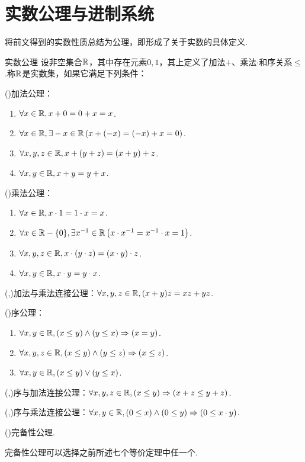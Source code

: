 \section{实数公理与进制系统}

将前文得到的实数性质总结为公理，即形成了关于实数的具体定义.

\begin{axiom}{实数公理}
	设非空集合$\mathbb{R}$，其中存在元素$0,1$，其上定义了加法$+$、乘法$\cdot$和序关系$\leq$.称$\mathbb{R}$是实数集，如果它满足下列条件：
	
	(\uppercase\expandafter{})加法公理：
	\begin{enumerate}
		\item $\forall x \in \mathbb{R} ,x+0=0+x=x$.
		\item $\forall x \in \mathbb{R} ,\exists -x \in \mathbb{R} \left( x+(-x)=(-x)+x=0 \right)$.
		\item $\forall x,y,z \in \mathbb{R} ,x+(y+z)=(x+y)+z$.
		\item $\forall x,y \in \mathbb{R} ,x+y=y+x$.
	\end{enumerate}
	
	(\uppercase\expandafter{})乘法公理：
	\begin{enumerate}
		\item $\forall x \in \mathbb{R} ,x \cdot 1=1 \cdot x=x$.
		\item $\forall x \in \mathbb{R} -\{ 0 \} ,\exists x^{-1} \in \mathbb{R} \left( x \cdot x^{-1} =x^{-1} \cdot x=1 \right)$.
		\item $\forall x,y,z \in \mathbb{R} ,x \cdot (y \cdot z)=(x \cdot y) \cdot z$.
		\item $\forall x,y \in \mathbb{R} ,x\cdot y=y\cdot x$.
	\end{enumerate}
	
	(\uppercase\expandafter{},\uppercase\expandafter{})加法与乘法连接公理：$\forall x,y,z \in \mathbb{R} ,(x+y)z=xz+yz$.
	
	(\uppercase\expandafter{})序公理：
	\begin{enumerate}
		\item $\forall x,y \in \mathbb{R} ,(x \leq y) \wedge (y \leq x) \Rightarrow (x=y)$.
		\item $\forall x,y,z \in \mathbb{R} ,(x \leq y) \wedge (y \leq z) \Rightarrow (x \leq z)$.
		\item $\forall x,y \in \mathbb{R} ,(x \leq y) \vee (y \leq x)$.
	\end{enumerate}
	
	(\uppercase\expandafter{},\uppercase\expandafter{})序与加法连接公理：$\forall x,y,z \in \mathbb{R} ,(x \leq y)\Rightarrow (x+z \leq y+z)$.
	
	(\uppercase\expandafter{},\uppercase\expandafter{})序与乘法连接公理：$\forall x,y \in \mathbb{R} ,(0\leq x) \wedge (0 \leq y) \Rightarrow (0 \leq x \cdot y)$.
	
	(\uppercase\expandafter{})完备性公理.
\end{axiom}
\begin{remark}
	完备性公理可以选择之前所述七个等价定理中任一个.
\end{remark}

